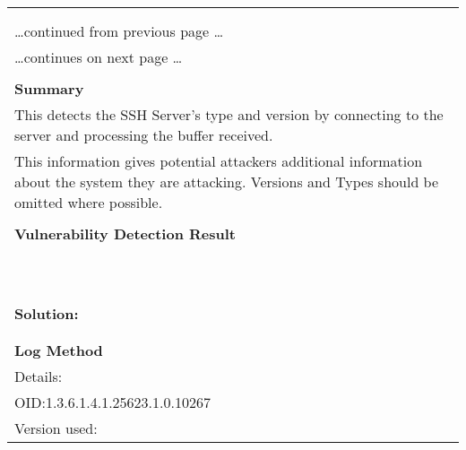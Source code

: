 \documentclass{article}
\begin{document}
\begin{longtable}{|p{}|}
\hline
\rowcolor{gvm_log}{\color{white}{Log (CVSS: 0.0) }}\\
\rowcolor{gvm_log}{\color{white}{NVT: SSH Server type and version}}\\
\hline
\endfirsthead
\hfill\ldots continued from previous page \ldots \\
\hline
\endhead
\hline
\ldots continues on next page \ldots \\
\endfoot
\hline
\endlastfoot
\\
\textbf{Summary}\\
This detects the SSH Server's type and version by connecting to the server
  and processing the buffer received.\\
  This information gives potential attackers additional information about the system they are attacking.
  Versions and Types should be omitted where possible.\\

        \hline
        \\
\textbf{Vulnerability Detection Result}\\
\rowcolor{white}{\verb=Remote SSH server banner: SSH-2.0-OpenSSH_8.4p1 Debian-5=}\\
\rowcolor{white}{\verb=Remote SSH supported authentication: none,password,publickey,hostbased,keyboard-=}\\
\rowcolor{white}{$\hookrightarrow$\verb=interactive=}\\
\rowcolor{white}{\verb=Remote SSH text/login banner: (not available)=}\\
\rowcolor{white}{\verb=This is probably:=}\\
\rowcolor{white}{\verb=- OpenSSH=}\\
\rowcolor{white}{\verb=Concluded from remote connection attempt with credentials:=}\\
\rowcolor{white}{\verb=Login:    OpenVASVT=}\\
\rowcolor{white}{\verb=Password: OpenVASVT=}\\

          \hline
          \\
\textbf{Solution:}\\
\\


        \hline
        \\
\textbf{Log Method}\\
Details:
\rowcolor{white}{\verb=SSH Server type and version=}\\
OID:1.3.6.1.4.1.25623.1.0.10267\\
Version used:
\rowcolor{white}{\verb=2021-09-28T06:32:28Z=}\\
\end{longtable}
\end{document}
